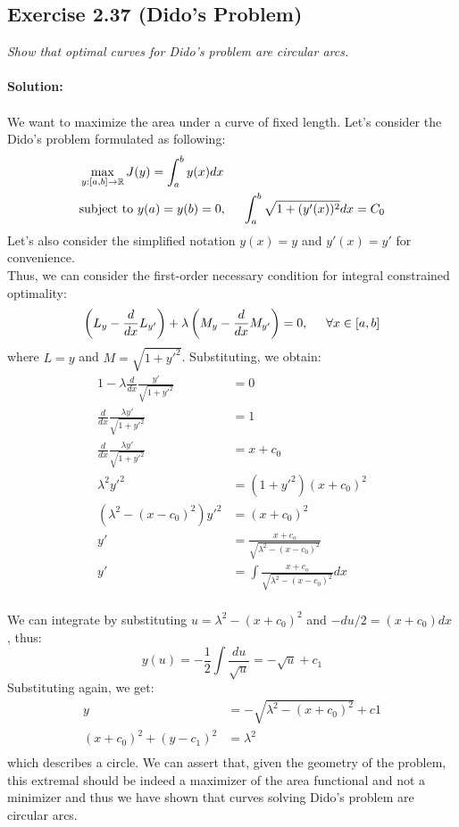\subsection{Exercise 2.37 (Dido's Problem)}
\emph{Show that optimal curves for Dido's problem are circular arcs.}\\
\\
\textbf{Solution:}\\
\\
We want to maximize the area under a curve of fixed length. Let's consider the Dido's problem formulated as following: 
\begin{align}
    &\max_{y: [a,b] \to \mathbb{R}} J(y) = \int_a^b y(x) dx   \\
    & \text{subject to } y(a) = y(b) = 0, \hspace{0.5cm} \int_a^b \sqrt{1 + (y'(x))^2} dx = C_0
\end{align}
Let's also consider the simplified notation $y(x) = y$ and $y'(x) = y'$ for convenience.\\
Thus, we can consider the first-order necessary condition for integral constrained optimality:
\begin{equation}
    \left( L_y - \frac{d}{dx}L_{y'} \right) + \lambda \left( M_y - \frac{d}{dx}M_{y'} \right) = 0, \hspace{0.5cm} \forall x \in [a,b]
\end{equation}
where $L = y$ and $M = \sqrt{1 + y'^2}$. Substituting, we obtain:
\begin{align}
    1 - \lambda \frac{d}{dx} \frac{ y'}{\sqrt{1 + y'^2}} & = 0 \\
    \frac{d}{dx} \frac{\lambda y'}{\sqrt{1 + y'^2}} & = 1 \\
    \frac{d}{dx} \frac{\lambda y'}{\sqrt{1 + y'^2}} & = x + c_0 \\
    \lambda ^ 2 y'^2 & = (1 + y'^2) ( x + c_0)^2 \\
    (\lambda ^2 - (x - c_0) ^2 ) y'^2 & = (x + c_0) ^2 \\
    y' & = \frac{x+c_o}{ \sqrt{ \lambda^2 - (x- c_0)^2}} \\
    y' & = \int \frac{x+c_o}{ \sqrt{ \lambda^2 - (x- c_0)^2}} dx \\
\end{align}

We can integrate by substituting $ u = \lambda^2 - (x+c_0 )^2 $ and  $-du/2 = (x + c_0)dx $ , thus: \\
\begin{equation}
    y(u) = - \frac{1}{2} \int \frac{du}{\sqrt{u}} = - \sqrt{u}  + c_1
\end{equation}
Substituting again, we get:
\begin{align}
    y &= - \sqrt{\lambda^2 - (x+c_0)^2} + c1 \\
    (x + c_0)^2 + (y - c_1)^2 &= \lambda^2\\
\end{align}
which describes a circle. We can assert that, given the geometry of the problem, this extremal should be indeed a maximizer of the area functional and not a minimizer and thus we have shown that curves solving Dido's problem are circular arcs.
\QEDB

